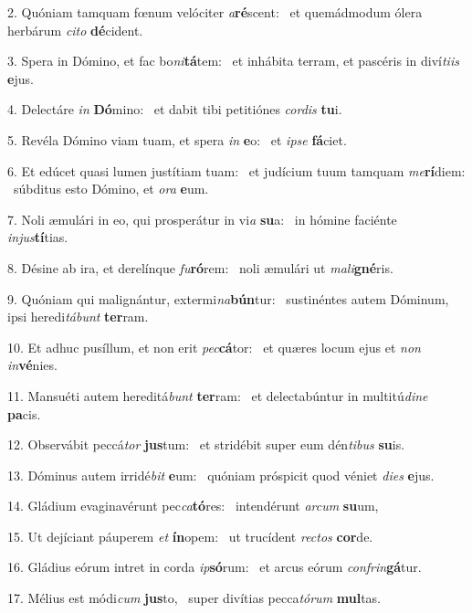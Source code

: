 2. Quóniam tamquam fœnum velóciter \textit{a}\textbf{ré}scent: \ast\  et quemádmodum ólera herbárum \textit{ci}\textit{to} \textbf{dé}cident.\

3. Spera in Dómino, et fac bo\textit{ni}\textbf{tá}tem: \ast\  et inhábita terram, et pascéris in diví\textit{ti}\textit{is} \textbf{e}jus.\

4. Delectáre \textit{in} \textbf{Dó}mino: \ast\  et dabit tibi petitiónes \textit{cor}\textit{dis} \textbf{tu}i.\

5. Revéla Dómino viam tuam, et spera \textit{in} \textbf{e}o: \ast\  et \textit{ip}\textit{se} \textbf{fá}ciet.\

6. Et edúcet quasi lumen justítiam tuam: \dag\  et judícium tuum tamquam \textit{me}\textbf{rí}diem: \ast\  súbditus esto Dómino, et \textit{o}\textit{ra} \textbf{e}um.\

7. Noli æmulári in eo, qui prosperátur in vi\textit{a} \textbf{su}a: \ast\  in hómine faciénte \textit{in}\textit{jus}\textbf{tí}tias.\

8. Désine ab ira, et derelínque \textit{fu}\textbf{ró}rem: \ast\  noli æmulári ut \textit{ma}\textit{li}\textbf{gné}ris.\

9. Quóniam qui malignántur, extermi\textit{na}\textbf{bún}tur: \ast\  sustinéntes autem Dóminum, ipsi heredi\textit{tá}\textit{bunt} \textbf{ter}ram.\

10. Et adhuc pusíllum, et non erit \textit{pec}\textbf{cá}tor: \ast\  et quæres locum ejus et \textit{non} \textit{in}\textbf{vé}nies.\

11. Mansuéti autem hereditá\textit{bunt} \textbf{ter}ram: \ast\  et delectabúntur in multitú\textit{di}\textit{ne} \textbf{pa}cis.\

12. Observábit peccá\textit{tor} \textbf{jus}tum: \ast\  et stridébit super eum dén\textit{ti}\textit{bus} \textbf{su}is.\

13. Dóminus autem irridé\textit{bit} \textbf{e}um: \ast\  quóniam próspicit quod véniet \textit{di}\textit{es} \textbf{e}jus.\

14. Gládium evaginavérunt pec\textit{ca}\textbf{tó}res: \ast\  intendérunt \textit{ar}\textit{cum} \textbf{su}um,\

15. Ut dejíciant páuperem \textit{et} \textbf{ín}opem: \ast\  ut trucídent \textit{rec}\textit{tos} \textbf{cor}de.\

16. Gládius eórum intret in corda \textit{ip}\textbf{só}rum: \ast\  et arcus eórum \textit{con}\textit{frin}\textbf{gá}tur.\

17. Mélius est módi\textit{cum} \textbf{jus}to, \ast\  super divítias pecca\textit{tó}\textit{rum} \textbf{mul}tas.\

